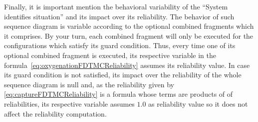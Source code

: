 Finally, it is important mention the behavioral variability of the ``System
identifies situation'' and its impact over its reliability. The behavior of
such sequence diagram is variable according to the optional combined fragments
which it comprises. By your turn, each combined fragment will only be executed
for the configurations which satisfy its guard condition. Thus, every time one
of its optional combined fragment is executed, its respective variable in the
formula~\ref{eq:oxygenationFDTMCReliability} assumes its reliability value. In
case its guard condition is not satisfied, its impact over the reliability of
the whole sequence diagram is null and, as the reliability given by
\ref{eq:captureFDTMCReliability} is a formula whose terms are products of of
reliabilities, its respective variable assumes $1.0$ as reliability value so it
does not affect the reliability computation. 
